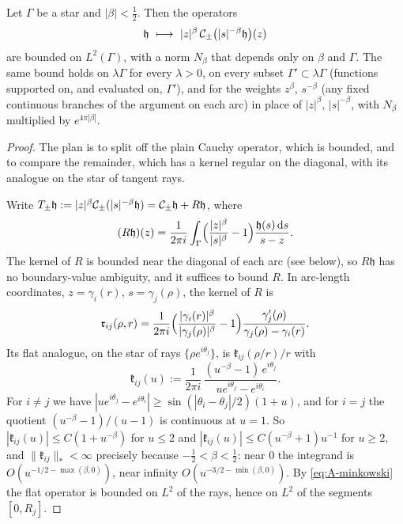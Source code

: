 \begin{lemma}\label{lem:A-power}
Let $\Gamma$ be a star and $|\beta|<\frac12$. Then the operators
\[
  \mathfrak h\ \longmapsto\ |z|^{\beta}\,\Cauchy_\pm\bigl(|s|^{-\beta}\mathfrak h\bigr)(z)
\]
are bounded on $L^2(\Gamma)$, with a norm $N_\beta$ that depends only on $\beta$ and $\Gamma$. The same bound holds on
$\lambda\Gamma$ for every $\lambda>0$, on every subset $\Gamma'\subset\lambda\Gamma$ (functions supported on, and
evaluated on, $\Gamma'$), and for the weights $z^{\beta}$, $s^{-\beta}$ (any fixed continuous branches of the argument
on each arc) in place of $|z|^\beta$, $|s|^{-\beta}$, with $N_\beta$ multiplied by $e^{4\pi|\beta|}$.
\end{lemma}

\begin{proof}
The plan is to split off the plain Cauchy operator, which is bounded, and to compare the remainder, which has a kernel
regular on the diagonal, with its analogue on the star of tangent rays.

Write $T_\pm\mathfrak h:=|z|^\beta\mathcal{C}_\pm(|s|^{-\beta}\mathfrak h)=\mathcal{C}_\pm\mathfrak h+R\mathfrak h$, where
\[
  (R\mathfrak h)(z)=\frac1{2\pi i}\int_\Gamma\Bigl(\frac{|z|^\beta}{|s|^\beta}-1\Bigr)\frac{\mathfrak h(s)\,\mathrm{d} s}{s-z}.
\]
The kernel of $R$ is bounded near the diagonal of each arc (see below), so $R\mathfrak h$ has no boundary-value
ambiguity, and it suffices to bound $R$. In arc-length coordinates, $z=\gamma_i(r)$, $s=\gamma_j(\rho)$, the kernel of
$R$ is
\[
  \mathfrak r_{ij}(\rho,r)=\frac1{2\pi i}\Bigl(\frac{|\gamma_i(r)|^\beta}{|\gamma_j(\rho)|^\beta}-1\Bigr)
  \frac{\gamma_j'(\rho)}{\gamma_j(\rho)-\gamma_i(r)} .
\]
Its flat analogue, on the star of rays $\{\rho e^{i\theta_j}\}$, is $\mathfrak k_{ij}(\rho/r)/r$ with
\[
  \mathfrak k_{ij}(u):=\frac1{2\pi i}\,\frac{(u^{-\beta}-1)\,e^{i\theta_j}}{ue^{i\theta_j}-e^{i\theta_i}} .
\]
For $i\ne j$ we have $|ue^{i\theta_j}-e^{i\theta_i}|\ge\sin(|\theta_i-\theta_j|/2)(1+u)$, and for $i=j$ the quotient
$(u^{-\beta}-1)/(u-1)$ is continuous at $u=1$. So $|\mathfrak k_{ij}(u)|\le C(1+u^{-\beta})$ for $u\le2$ and
$|\mathfrak k_{ij}(u)|\le C(u^{-\beta}+1)u^{-1}$ for $u\ge2$, and $\|\mathfrak k_{ij}\|_*<\infty$ precisely because
$-\frac12<\beta<\frac12$: near $0$ the integrand is $O(u^{-1/2-\max(\beta,0)})$, near infinity $O(u^{-3/2-\min(\beta,0)})$.
By \eqref{eq:A-minkowski} the flat operator is bounded on $L^2$ of the rays, hence on $L^2$ of the segments $[0,R_j]$.


\end{proof}
